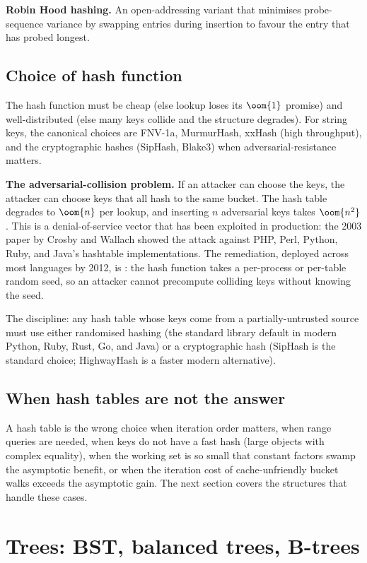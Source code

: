 \textbf{Robin Hood hashing.} An open-addressing variant that minimises probe-sequence variance by swapping entries during insertion to favour the entry that has probed longest.

\subsection{Choice of hash function}

The hash function must be cheap (else lookup loses its $\oom{1}$ promise) and well-distributed (else many keys collide and the structure degrades). For string keys, the canonical choices are FNV-1a, MurmurHash, xxHash (high throughput), and the cryptographic hashes (SipHash, Blake3) when adversarial-resistance matters.

\textbf{The adversarial-collision problem.} If an attacker can choose the keys, the attacker can choose keys that all hash to the same bucket. The hash table degrades to $\oom{n}$ per lookup, and inserting $n$ adversarial keys takes $\oom{n^2}$. This is a denial-of-service vector that has been exploited in production: the 2003 paper by Crosby and Wallach showed the attack against PHP, Perl, Python, Ruby, and Java's hashtable implementations. The remediation, deployed across most languages by 2012, is : the hash function takes a per-process or per-table random seed, so an attacker cannot precompute colliding keys without knowing the seed.

The discipline: any hash table whose keys come from a partially-untrusted source must use either randomised hashing (the standard library default in modern Python, Ruby, Rust, Go, and Java) or a cryptographic hash (SipHash is the standard choice; HighwayHash is a faster modern alternative).

\subsection{When hash tables are not the answer}

A hash table is the wrong choice when iteration order matters, when range queries are needed, when keys do not have a fast hash (large objects with complex equality), when the working set is so small that constant factors swamp the asymptotic benefit, or when the iteration cost of cache-unfriendly bucket walks exceeds the asymptotic gain. The next section covers the structures that handle these cases.

\section{Trees: BST, balanced trees, B-trees}

